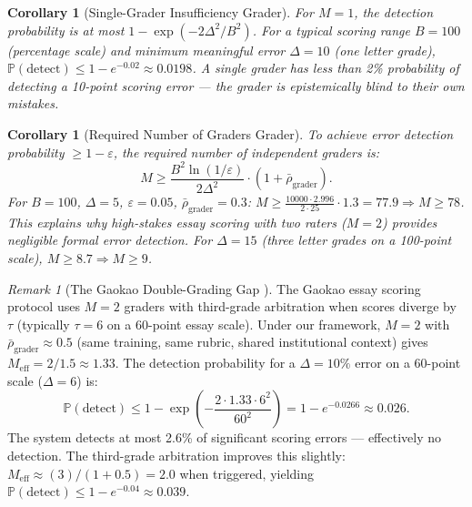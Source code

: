 \documentclass[11pt,a4paper]{article}
\newtheorem{corollary}[theorem]{Corollary}
\theoremstyle{definition}
\theoremstyle{remark}
\newtheorem{remark}[theorem]{Remark}
\newcommand{\Pbb}{\mathbb{P}}
\begin{document}
\begin{corollary}[Single-Grader Insufficiency Grader]
\label{cor:single_grader}
For $M=1$, the detection probability is at most $1 - \exp(-2\Delta^2/B^2)$. For a typical scoring range $B=100$ (percentage scale) and minimum meaningful error $\Delta=10$ (one letter grade), $\Pbb(\text{detect}) \le 1 - e^{-0.02} \approx 0.0198$. A single grader has less than 2\% probability of detecting a 10-point scoring error — the grader is epistemically blind to their own mistakes.
\end{corollary}
\begin{corollary}[Required Number of Graders Grader]
\label{cor:required_M}
To achieve error detection probability $\ge 1 - \varepsilon$, the required number of independent graders is:
\begin{equation}
    M \ge \frac{B^2 \ln(1/\varepsilon)}{2 \Delta^2} \cdot (1 + \bar{\rho}_{\text{grader}}).
    \label{eq:M_required_edu}
\end{equation}
For $B=100$, $\Delta=5$, $\varepsilon=0.05$, $\bar{\rho}_{\text{grader}}=0.3$: $M \ge \frac{10000 \cdot 2.996}{2 \cdot 25} \cdot 1.3 = 77.9 \Rightarrow M \ge 78$. This explains why high-stakes essay scoring with two raters ($M=2$) provides negligible formal error detection. For $\Delta=15$ (three letter grades on a 100-point scale), $M \ge 8.7 \Rightarrow M \ge 9$.
\end{corollary}
\begin{remark}[The Gaokao Double-Grading Gap ]
The Gaokao essay scoring protocol uses $M=2$ graders with third-grade arbitration when scores diverge by $\tau$ (typically $\tau=6$ on a 60-point essay scale). Under our framework, $M=2$ with $\bar{\rho}_{\text{grader}} \approx 0.5$ (same training, same rubric, shared institutional context) gives $M_{\text{eff}} = 2/1.5 \approx 1.33$. The detection probability for a $\Delta=10\%$ error on a 60-point scale ($\Delta=6$) is:
\begin{equation}
    \Pbb(\text{detect}) \le 1 - \exp\left(-\frac{2 \cdot 1.33 \cdot 6^2}{60^2}\right) = 1 - e^{-0.0266} \approx 0.026.
\end{equation}
The system detects at most 2.6\% of significant scoring errors — effectively no detection. The third-grade arbitration improves this slightly: $M_{\text{eff}} \approx (3)/(1+0.5) = 2.0$ when triggered, yielding $\Pbb(\text{detect}) \le 1 - e^{-0.04} \approx 0.039$.
\end{remark}
\end{document}

